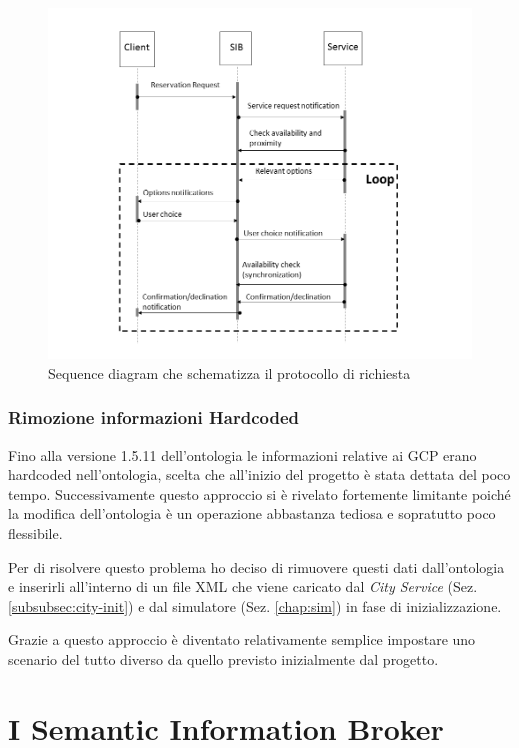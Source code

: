\begin{figure}
	\centering
	\includegraphics[width=1.0\textwidth]{assets/reservation-seq-diagram.png}
	\caption{Sequence diagram che schematizza il protocollo di richiesta}
	\label{fig:res-sec}
\end{figure}

\subsubsection{Rimozione informazioni Hardcoded}

Fino alla versione 1.5.11 dell'ontologia le informazioni relative ai GCP erano hardcoded nell'ontologia, scelta che all'inizio del progetto è stata dettata del poco tempo. Successivamente questo approccio si è rivelato fortemente limitante poiché la modifica dell'ontologia è un operazione abbastanza tediosa e sopratutto poco flessibile. 

Per di risolvere questo problema ho deciso di rimuovere questi dati dall'ontologia e inserirli all'interno di un file XML che viene caricato dal \emph{City Service} (Sez. \ref{subsubsec:city-init}) e dal simulatore (Sez. \ref{chap:sim}) in fase di inizializzazione.

Grazie a questo approccio è diventato relativamente semplice impostare uno scenario del tutto diverso da quello previsto inizialmente dal progetto.

\section{I Semantic Information Broker}

